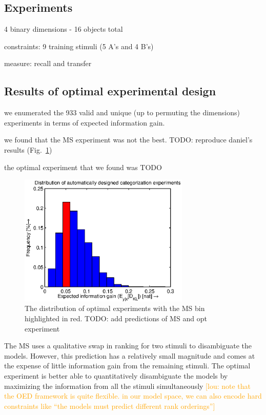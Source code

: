 \documentclass{article}
\newcommand{\lou}[1]{\textcolor{orange}{[lou: #1]}}
\newcommand{\cas}[1]{ \textsf{\color{darkgray} \scriptsize #1} }
\begin{document}
\subsection{Experiments}

\cas{4 binary dimensions - 16 objects total}

\cas{constraints: 9 training stimuli (5 A's and 4 B's)}

\cas{measure: recall and transfer}

\subsection{Results of optimal experimental design}

\cas{we enumerated the 933 valid and unique (up to permuting the dimensions) experiments in terms of expected information gain.}

\cas{we found that the MS experiment was not the best. TODO: reproduce daniel's results (Fig.~\ref{fig:dist})}

\cas{the optimal experiment that we found was TODO}

\begin{figure}[h!]
\centering
\includegraphics[width=3.2in]{img/dist.eps}
\caption{The distribution of optimal experiments with the MS bin highlighted in red. TODO: add predictions of MS and opt experiment}
\label{fig:dist}
\end{figure}

The MS uses a qualitative swap in ranking for two stimuli to disambiguate the models.
However, this prediction has a relatively small magnitude and comes at the expense of little information gain from the remaining stimuli.
The optimal experiment is better able to quantitatively disambiguate the models by maximizing the information from all the stimuli simultaneously
\lou{note that the OED framework is quite flexible. in our model space, we can also encode hard constraints like ``the models must predict different rank orderings''}
\end{document}
